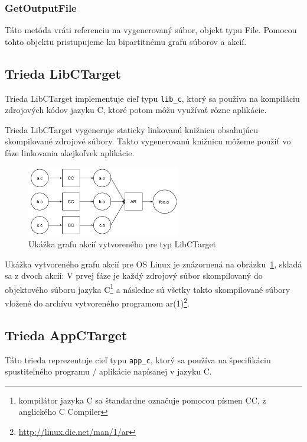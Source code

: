 \subsubsection{GetOutputFile}
Táto metóda vráti referenciu na vygenerovaný súbor, objekt typu File. Pomocou tohto
objektu pristupujeme ku bipartitnému grafu súborov a akcií.

\subsection{Trieda LibCTarget}
\label{sec:master:libctarget}

Trieda LibCTarget implementuje cieľ typu \verb!lib_c!, ktorý sa používa na
kompiláciu zdrojových kódov jazyku C, ktoré potom môžu využívať rôzne aplikácie.

Trieda LibCTarget vygeneruje staticky linkovanú knižnicu obsahujúcu skompilované
zdrojové súbory. Takto vygenerovanú knižnicu môžeme použiť vo fáze linkovania
akejkoľvek aplikácie.

\begin{figure}[h]
  \centerline{\includegraphics[width=0.6\textwidth]{images/libctarget}}
  \caption[Graf akcií pre typ LibCTarget]{Ukážka grafu akcií vytvoreného pre typ
  LibCTarget}
  \label{img:libctarget}
\end{figure}


Ukážka vytvoreného grafu akcií pre OS Linux je znázornená na obrázku~\ref{img:libctarget},
skladá sa z dvoch akcií: V prvej fáze je každý zdrojový súbor skompilovaný
do objektového súboru jazyka C\footnote{kompilátor jazyka C sa štandardne označuje
pomocou písmen CC, z anglického C Compiler} a následne sú všetky takto skompilované súbory
vložené do archívu vytvoreného programom ar(1)\footnote{\url{http://linux.die.net/man/1/ar}}.

\subsection{Trieda AppCTarget}
\label{sec:master:appctarget}

Táto trieda reprezentuje cieľ typu \verb!app_c!, ktorý sa používa na špecifikáciu
spustiteľného programu / aplikácie napísanej v jazyku C.

